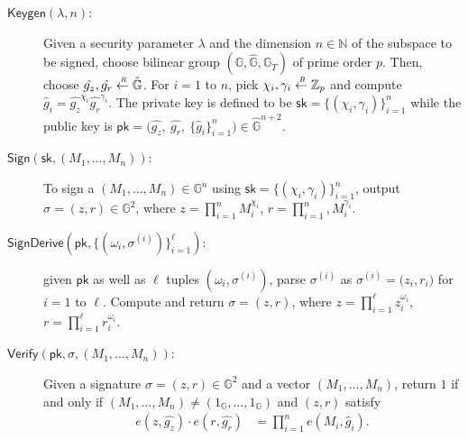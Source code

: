 \documentclass[10pt]{llncs}
\newcommand{\G}{\mathbb{G}}
\newcommand{\Z}{\mathbb{Z}}
\newcommand{\sk}{\mathsf{sk}}
\newcommand{\pk}{\mathsf{pk}}
\newcommand{\sample}{\stackrel{{\scriptscriptstyle \mkern4mu R}}{\gets}}
\begin{document}
\begin{comment}
\item[\boldmath$\mathsf{Verify}(\pk,\sigma, (M_1,\dotsc,M_n))$:] Given
  a signature $\sigma=(z,r,u ) \in \G^3$ and a vector
  $(M_1,\dotsc,M_n)$, return $1$ if and only if $(M_1,\dotsc,M_n)\neq
  (1_{\G},\dotsc,1_{\G})$ and $(z,r,u )$ satisfy
  \begin{align*}
    e(z,\hat{g}_z) \cdot e(r,\hat{g}_r) & = \prod_{i=1}^n e(M_i,\hat{g}_i) \thinspace, & 
		e(z,\hat{h}_z) \cdot e(u,\hat{h}_u) & = \prod_{i=1}^n e(M_i,\hat{h}_i) \enspace.
  \end{align*}
\end{description}

\end{comment}






\begin{description}

\item[\boldmath$\mathsf{Keygen}(\lambda,n)$:] Given a security
  parameter $\lambda$ and the dimension $n \in \mathbb{N}$ of the
  subspace to be signed, choose bilinear group $(\G,\hat{\G},\G_T)$ of
  prime order $p$. %
  Then, choose $\hat{g_z},\hat{g_r}  \sample
  \hat{\G}$.  For $i=1$ to $n$, pick $\chi_i,\gamma_i  \sample
  \Z_p$ and compute $\hat{g}_i=\hat{g_z}^{\chi_i}
  \hat{g_r}^{\gamma_i}$.  The private key is defined to be $\sk = \{ (\chi_i,
  \gamma_i  ) \}_{i=1}^n $ while the public key is $ \pk=\big(
  \hat{g_z},~\hat{g_r}, ~\{  \hat{g}_i 
    \}_{i=1}^n \big) \in \hat{\G}^{ n+2}$.
 
\item[\boldmath$\mathsf{Sign}(\sk, (M_1,\dotsc,M_n))$:] To sign a
   $(M_1,\dotsc,M_n) \in \G^n$ using $\sk= \{ (\chi_i,
  \gamma_i  ) \}_{i=1}^n $, output $\sigma=(z,r  ) \in \G^2
  $, where $z = \prod_{i=1}^n M_i^{\chi_i} $, $r = \prod_{i=1}^n,
  M_i^{\gamma_i} $.

\item[\boldmath$\mathsf{SignDerive}(\pk, \{(\omega_i,
  \sigma^{(i)})\}_{i=1}^\ell)$:] given   $\pk$ as well as
  $\ell$ tuples $(\omega_i,\sigma^{(i)}) $, parse $\sigma^{(i)}$ as
  $\sigma^{(i)}=\big( z_i,r_i \big)  $ for $i=1$ to
  $\ell$.  Compute and return $\sigma=(z,r  )$, where $z =
  \prod_{i=1}^\ell z_{i}^{\omega_i}$, $r=\prod_{i=1}^{\ell}
  r_i^{\omega_i}$.

\item[\boldmath$\mathsf{Verify}(\pk,\sigma, (M_1,\dotsc,M_n))$:] Given
  a signature $\sigma=(z,r  ) \in \G^2$ and a vector
  $(M_1,\dotsc,M_n)$, return $1$ if and only if $(M_1,\dotsc,M_n)\neq
  (1_{\G},\dotsc,1_{\G})$ and $(z,r  )$ satisfy
  \begin{align*}
    e(z,\hat{g_z}) \cdot e(r,\hat{g_r}) & = \prod_{i=1}^n e(M_i,\hat{g}_i) .
  \end{align*}
	
\end{description}
\end{document}
